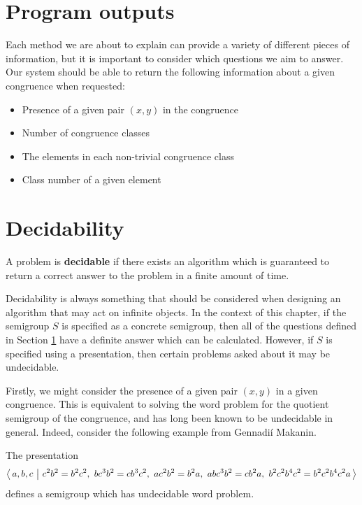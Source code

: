 \section{Program outputs}
\label{sec:program-outputs}

Each method we are about to explain can provide a variety of different pieces of
information, but it is important to consider which questions we aim to answer.
Our system should be able to return the following information about a given
congruence when requested:

\begin{itemize}
\item Presence of a given pair $(x,y)$ in the congruence
\item Number of congruence classes
\item The elements in each non-trivial congruence class
\item Class number of a given element
\end{itemize}

\clearpage

\section{Decidability}
\label{sec:decidability}

\begin{definition}
  \label{def:decidable}
  A problem is \textbf{decidable} if there exists an algorithm which is
  guaranteed to return a correct answer to the problem in a finite amount of
  time.
\end{definition}

Decidability is always something that should be considered when designing an
algorithm that may act on infinite objects.  In the context of this chapter, if
the semigroup $S$ is specified as a concrete semigroup, then all of the
questions defined in Section \ref{sec:program-outputs} have a definite answer
which can be calculated.  However, if $S$ is specified using a presentation,
then certain problems asked about it may be undecidable.

Firstly, we might consider the presence of a given pair $(x,y)$ in a given
congruence.  This is equivalent to solving the word problem for the quotient
semigroup of the congruence, and has long been known to be undecidable in
general.  Indeed, consider the following example from Gennadi\'{i} Makanin.

\begin{example}[Makanin, 1966]
  The presentation
  $$\pres{a,b,c}{c^2b^2 = b^2c^2,\ bc^3b^2 = cb^3c^2,\ ac^2b^2 = b^2a,\ abc^3b^2 = cb^2a,\ b^2c^2b^4c^2 = b^2c^2b^4c^2a}$$
  defines a semigroup which has undecidable word problem.  \cite{makanin_1966}
\end{example}

